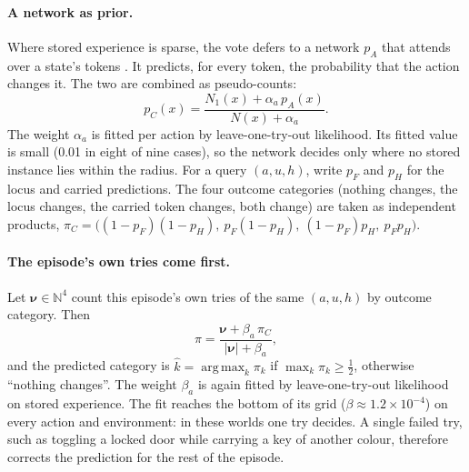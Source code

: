 \documentclass{article}
\DeclareMathOperator*{\argmax}{arg\,max}
\begin{document}
\paragraph{A network as prior.} Where stored experience is sparse, the vote defers to a network $p_A$ that attends over a state's tokens \cite{Vaswani2017,Battaglia2018}. It predicts, for every token, the probability that the action changes it. The two are combined as pseudo-counts:
\begin{equation} \label{eq:armc}
    p_C(x) = \frac{N_1(x) + \alpha_a\, p_A(x)}{N(x) + \alpha_a}.
\end{equation}
The weight $\alpha_a$ is fitted per action by leave-one-try-out likelihood. Its fitted value is small (0.01 in eight of nine cases), so the network decides only where no stored instance lies within the radius. For a query $(a,u,h)$, write $p_F$ and $p_H$ for the locus and carried predictions. The four outcome categories (nothing changes, the locus changes, the carried token changes, both change) are taken as independent products, $\pi_C = \big((1-p_F)(1-p_H),\ p_F(1-p_H),\ (1-p_F)p_H,\ p_F p_H\big)$.

\paragraph{The episode's own tries come first.} Let $\boldsymbol{\nu}\in\mathbb{N}^4$ count this episode's own tries of the same $(a,u,h)$ by outcome category. Then
\begin{equation} \label{eq:own}
    \pi = \frac{\boldsymbol{\nu} + \beta_a\,\pi_C}{|\boldsymbol{\nu}| + \beta_a},
\end{equation}
and the predicted category is $\hat{k}=\argmax_k \pi_k$ if $\max_k\pi_k\ge\tfrac12$, otherwise ``nothing changes''. The weight $\beta_a$ is again fitted by leave-one-try-out likelihood on stored experience. The fit reaches the bottom of its grid ($\beta\approx1.2\times10^{-4}$) on every action and environment: in these worlds one try decides. A single failed try, such as toggling a locked door while carrying a key of another colour, therefore corrects the prediction for the rest of the episode.
\end{document}
